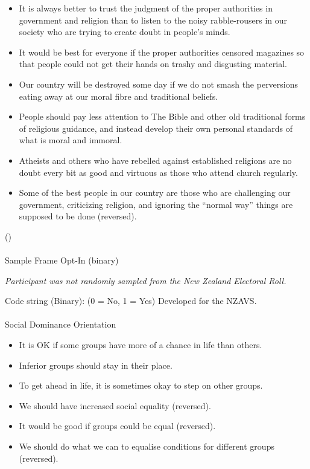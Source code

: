 \documentclass[
  single column]{article}
\makeatletter
\let\oldparagraph\paragraph
\renewcommand{\paragraph}{
    \@ifstar
      \xxxParagraphStar
      \xxxParagraphNoStar
  }
\newcommand{\xxxParagraphStar}[1]{\oldparagraph*{#1}\mbox{}}
\newcommand{\xxxParagraphNoStar}[1]{\oldparagraph{#1}\mbox{}}
\providecommand{\tightlist}{%
  \setlength{\itemsep}{0pt}\setlength{\parskip}{0pt}}\usepackage{longtable,booktabs,array}
\makeatother
\begin{document}
\begin{itemize}
\tightlist
\item
  It is always better to trust the judgment of the proper authorities in
  government and religion than to listen to the noisy rabble-rousers in
  our society who are trying to create doubt in people's minds.
\item
  It would be best for everyone if the proper authorities censored
  magazines so that people could not get their hands on trashy and
  disgusting material.
\item
  Our country will be destroyed some day if we do not smash the
  perversions eating away at our moral fibre and traditional beliefs.
\item
  People should pay less attention to The Bible and other old
  traditional forms of religious guidance, and instead develop their own
  personal standards of what is moral and immoral.
\item
  Atheists and others who have rebelled against established religions
  are no doubt every bit as good and virtuous as those who attend church
  regularly.
\item
  Some of the best people in our country are those who are challenging
  our government, criticizing religion, and ignoring the ``normal way''
  things are supposed to be done (reversed).
\end{itemize}

()

\paragraph{Sample Frame Opt-In
(binary)}\label{sample-frame-opt-in-binary}

\emph{Participant was not randomly sampled from the New Zealand
Electoral Roll.}

Code string (Binary): (0 = No, 1 = Yes) Developed for the NZAVS.

\paragraph{Social Dominance
Orientation}\label{social-dominance-orientation}

\begin{itemize}
\tightlist
\item
  It is OK if some groups have more of a chance in life than others.
\item
  Inferior groups should stay in their place.
\item
  To get ahead in life, it is sometimes okay to step on other groups.
\item
  We should have increased social equality (reversed).
\item
  It would be good if groups could be equal (reversed).
\item
  We should do what we can to equalise conditions for different groups
  (reversed).
\end{itemize}
\end{document}
